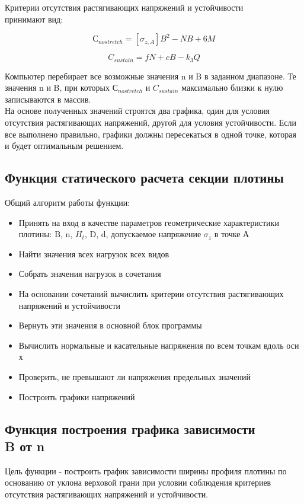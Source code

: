 \documentclass[12pt,a4paper,oneside,draft,titlepage]{article}
\begin{document}
Критерии отсутствия растягивающих напряжений и устойчивости \\
принимают вид:

$$ С_{nostretch} = [\sigma_{z,A}]  B ^ 2 - N  B + 6  M $$

$$ C_{sustain} = f  N + c  B - k_3  Q $$


Компьютер перебирает все возможные значения n и B в заданном диапазоне.
Те значения n и B, при которых $С_{nostretch}$ и $C_{sustain}$ максимально близки к нулю записываются в массив.\\
На основе полученных значений строятся два графика, один для условия отсутствия растягивающих напряжений, другой для условия устойчивости.
Если все выполнено правильно, графики должны пересекаться в одной точке, которая и будет оптимальным решением.

\subsection{Функция статического расчета секции плотины}

Общий алгоритм работы функции:
\begin{itemize}
	\item Принять на вход в качестве параметров геометрические характеристики плотины: B, n, $H_t$, D, d, допускаемое напряжение $\sigma_z$ в точке А
	\item Найти значения всех нагрузок всех видов
	\item Собрать значения нагрузок в сочетания
	\item На основании сочетаний вычислить критерии отсутствия растягивающих напряжений и устойчивости
	\item Вернуть эти значения в основной блок программы
	\item Вычислить нормальные и касательные напряжения по всем точкам вдоль оси х
	\item Проверить, не превышают ли напряжения предельных значений
	\item Построить графики напряжений
\end{itemize}


\subsection{Функция построения графика зависимости\\ B от n}

Цель функции - построить график зависимости ширины профиля плотины по основанию от уклона верховой грани при условии соблюдения критериев отсутствия растягивающих напряжений и устойчивости.
\end{document}
